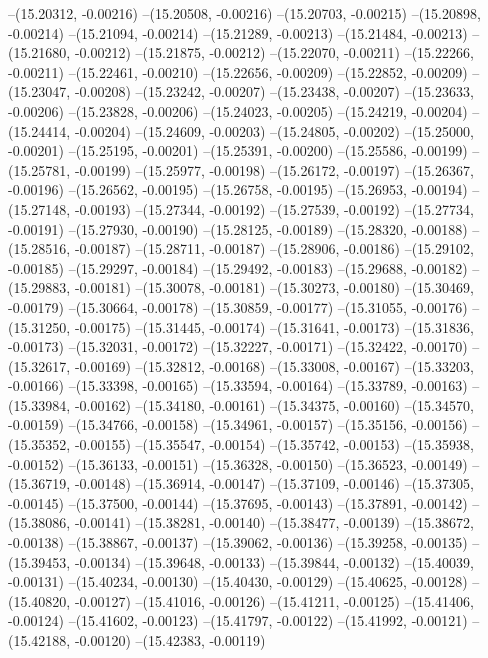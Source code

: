 --(15.20312, -0.00216)
--(15.20508, -0.00216)
--(15.20703, -0.00215)
--(15.20898, -0.00214)
--(15.21094, -0.00214)
--(15.21289, -0.00213)
--(15.21484, -0.00213)
--(15.21680, -0.00212)
--(15.21875, -0.00212)
--(15.22070, -0.00211)
--(15.22266, -0.00211)
--(15.22461, -0.00210)
--(15.22656, -0.00209)
--(15.22852, -0.00209)
--(15.23047, -0.00208)
--(15.23242, -0.00207)
--(15.23438, -0.00207)
--(15.23633, -0.00206)
--(15.23828, -0.00206)
--(15.24023, -0.00205)
--(15.24219, -0.00204)
--(15.24414, -0.00204)
--(15.24609, -0.00203)
--(15.24805, -0.00202)
--(15.25000, -0.00201)
--(15.25195, -0.00201)
--(15.25391, -0.00200)
--(15.25586, -0.00199)
--(15.25781, -0.00199)
--(15.25977, -0.00198)
--(15.26172, -0.00197)
--(15.26367, -0.00196)
--(15.26562, -0.00195)
--(15.26758, -0.00195)
--(15.26953, -0.00194)
--(15.27148, -0.00193)
--(15.27344, -0.00192)
--(15.27539, -0.00192)
--(15.27734, -0.00191)
--(15.27930, -0.00190)
--(15.28125, -0.00189)
--(15.28320, -0.00188)
--(15.28516, -0.00187)
--(15.28711, -0.00187)
--(15.28906, -0.00186)
--(15.29102, -0.00185)
--(15.29297, -0.00184)
--(15.29492, -0.00183)
--(15.29688, -0.00182)
--(15.29883, -0.00181)
--(15.30078, -0.00181)
--(15.30273, -0.00180)
--(15.30469, -0.00179)
--(15.30664, -0.00178)
--(15.30859, -0.00177)
--(15.31055, -0.00176)
--(15.31250, -0.00175)
--(15.31445, -0.00174)
--(15.31641, -0.00173)
--(15.31836, -0.00173)
--(15.32031, -0.00172)
--(15.32227, -0.00171)
--(15.32422, -0.00170)
--(15.32617, -0.00169)
--(15.32812, -0.00168)
--(15.33008, -0.00167)
--(15.33203, -0.00166)
--(15.33398, -0.00165)
--(15.33594, -0.00164)
--(15.33789, -0.00163)
--(15.33984, -0.00162)
--(15.34180, -0.00161)
--(15.34375, -0.00160)
--(15.34570, -0.00159)
--(15.34766, -0.00158)
--(15.34961, -0.00157)
--(15.35156, -0.00156)
--(15.35352, -0.00155)
--(15.35547, -0.00154)
--(15.35742, -0.00153)
--(15.35938, -0.00152)
--(15.36133, -0.00151)
--(15.36328, -0.00150)
--(15.36523, -0.00149)
--(15.36719, -0.00148)
--(15.36914, -0.00147)
--(15.37109, -0.00146)
--(15.37305, -0.00145)
--(15.37500, -0.00144)
--(15.37695, -0.00143)
--(15.37891, -0.00142)
--(15.38086, -0.00141)
--(15.38281, -0.00140)
--(15.38477, -0.00139)
--(15.38672, -0.00138)
--(15.38867, -0.00137)
--(15.39062, -0.00136)
--(15.39258, -0.00135)
--(15.39453, -0.00134)
--(15.39648, -0.00133)
--(15.39844, -0.00132)
--(15.40039, -0.00131)
--(15.40234, -0.00130)
--(15.40430, -0.00129)
--(15.40625, -0.00128)
--(15.40820, -0.00127)
--(15.41016, -0.00126)
--(15.41211, -0.00125)
--(15.41406, -0.00124)
--(15.41602, -0.00123)
--(15.41797, -0.00122)
--(15.41992, -0.00121)
--(15.42188, -0.00120)
--(15.42383, -0.00119)
